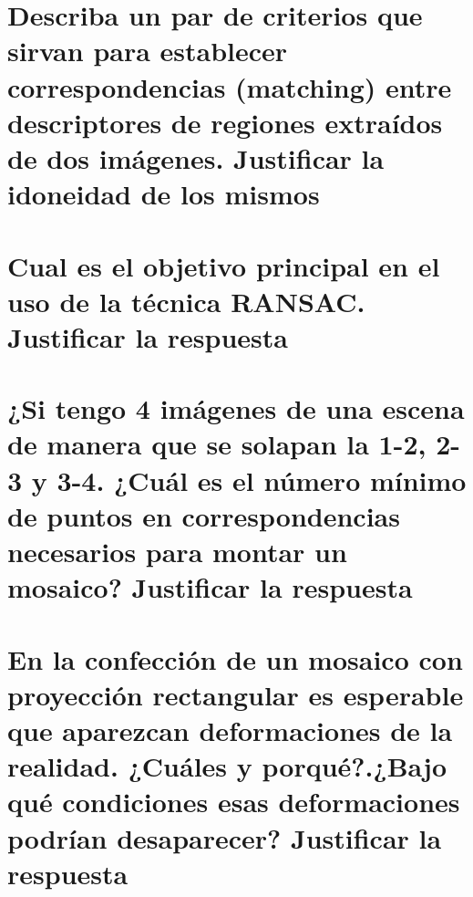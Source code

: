 \section{Describa un par de criterios que sirvan para establecer correspondencias
(matching) entre descriptores de regiones extraídos de dos imágenes. Justificar
la idoneidad de los mismos}

\section{Cual es el objetivo principal en el uso de la técnica RANSAC. Justificar
la respuesta}

\section{¿Si tengo 4 imágenes de una escena de manera que se solapan la 1-2, 2-3
y 3-4. ¿Cuál es el número mínimo de puntos en correspondencias necesarios para
montar un mosaico? Justificar la respuesta}

\section{En la confección de un mosaico con proyección rectangular es esperable
que aparezcan deformaciones de la realidad. ¿Cuáles y porqué?.¿Bajo qué
condiciones esas deformaciones podrían desaparecer? Justificar la respuesta}


